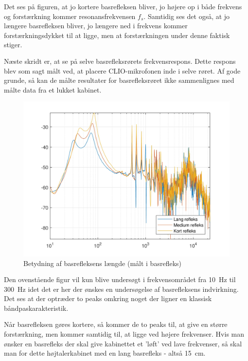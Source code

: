 Det ses på figuren, at jo kortere basrefleksen bliver, jo højere op i både frekvens og forstærkning kommer resonansfrekvensen $f_s$. Samtidig ses det også, at jo længere basrefleksen bliver, jo længere ned i frekvens kommer forstærkningsdykket til at ligge, men at forstærkningen under denne faktisk stiger.

Næste skridt er, at se på selve basrefleksrørets frekvensrespons. Dette respons blev som sagt målt ved, at placere CLIO-mikrofonen inde i selve røret. Af gode grunde, så kan de målte resultater for basrefleksrøret ikke sammenlignes med målte data fra et lukket kabinet.
\begin{figure}[H]
	\centering
	\vspace{-12pt}
	\includegraphics[width=\textwidth]{Billeder/Grafer/BasrefleksLengthTube}
	\caption{Betydning af basrefleksens længde (målt i basrefleks)}
\end{figure}

Den ovenstående figur vil kun blive undersøgt i frekvensområdet fra \SI{10}{\hertz} til \SI{300}{\hertz} idet det er her der ønskes en undersøgelse af basrefleksens indvirkning. Det ses at der optræder to peaks omkring noget der ligner en klassisk båndpaskarakteristik.

Når basrefleksen gøres kortere, så kommer de to peaks til, at give en større forstærkning, men kommer samtidig til, at ligge ved højere frekvenser. Hvis man ønsker en basrefleks der skal give kabinettet et 'løft' ved lave frekvenser, så skal man for dette højtalerkabinet med en lang basrefleks - altså \SI{15}{\centi\meter}.

